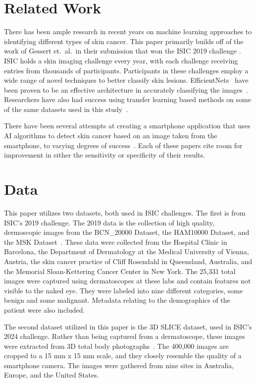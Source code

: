 \documentclass{article}
\begin{document}
\section{Related Work}

There has been ample research in recent years on machine learning approaches to identifying different types of skin cancer. This paper primarily builds off of the work of Gessert et.\ al.\ in their submission that won the ISIC 2019 challenge . ISIC holds a skin imaging challenge every year, with each challenge receiving entries from thousands of participants. Participants in these challenges employ a wide range of novel techniques to better classify skin lesions. EfficientNets~\cite{pmlr-v97-tan19a} have been proven to be an effective architecture in accurately classifying the images~\cite{venugopal2023deep,ali2022multiclass,sm2023classification}. Researchers have also had success using transfer learning based methods on some of the same datasets used in this study~\cite{moldovan2019,bassi2019}.

There have been several attempts at creating a smartphone application that uses AI algorithms to detect skin cancer based on an image taken from the smartphone, to varying degrees of success~\cite{wolf2013diagnostic,maier2015accuracy,udrea2020accuracy,chuchu1996smartphone}. Each of these papers cite room for improvement in either the sensitivity or specificity of their results.

\section{Data}

This paper utilizes two datasets, both used in ISIC challenges. The first is from ISIC’s 2019 challenge. The 2019 data is the collection of high quality, dermoscopic images from the 
BCN\_20000 Dataset, the HAM10000 Dataset, and the MSK Dataset~\cite{bcn20000,ham10000,msk}. These data were collected from the Hospital Clínic in Barcelona, the Department of 
Dermatology at the Medical University of Vienna, Austria, the skin cancer practice of Cliff Rosendahl in Queensland, Australia, and the Memorial 
Sloan-Kettering Cancer Center in New York. The 25,331 total images were captured using dermatoscopes at these labs and contain features not visible to the naked eye. They were labeled into nine different 
categories, some benign and some malignant. Metadata relating to the demographics of the patient were also included.

The second dataset utilized in this paper is the 3D SLICE dataset, used in ISIC’s 2024 challenge. Rather than being captured from a dermatoscope, these images were extracted from 3D total body photographs~\cite{slice3d}. The 400,000 images are cropped to a 15 mm x 15 mm scale, and they closely resemble the quality of a smartphone camera. The images were gathered from nine sites in Australia, Europe, and the United States.
\end{document}
